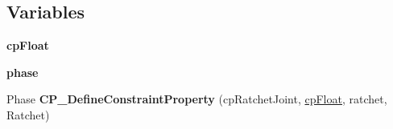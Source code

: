 \subsection*{Variables}
\begin{DoxyCompactItemize}
\item 
\hypertarget{group__cp_ratchet_joint_ga771844b3ae466da0613e76d364d00bd3}{{\bfseries cp\-Float}}\label{group__cp_ratchet_joint_ga771844b3ae466da0613e76d364d00bd3}

\item 
\hypertarget{group__cp_ratchet_joint_ga4432ad5c680b2372adf2f56998516c6d}{{\bfseries phase}}\label{group__cp_ratchet_joint_ga4432ad5c680b2372adf2f56998516c6d}

\item 
\hypertarget{group__cp_ratchet_joint_gacf79d1b1852509a558962faa2d8ee617}{Phase {\bfseries C\-P\-\_\-\-Define\-Constraint\-Property} (cp\-Ratchet\-Joint, \hyperlink{group__basic_types_gac1ed65573e035bf892505768c852d8d3}{cp\-Float}, ratchet, Ratchet)}\label{group__cp_ratchet_joint_gacf79d1b1852509a558962faa2d8ee617}

\end{DoxyCompactItemize}
